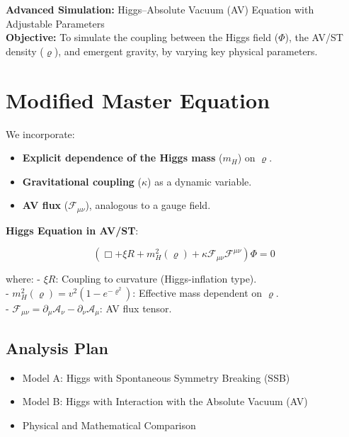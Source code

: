 \documentclass[twoside]{article}
\theoremstyle{definition}
\theoremstyle{remark}
\numberwithin{equation}{section}
\theoremstyle{definition}
\theoremstyle{example}
\theoremstyle{remark}
\numberwithin{equation}{section}%
\begin{document}
	\textbf{Advanced Simulation:} Higgs–Absolute Vacuum (AV) Equation with Adjustable Parameters\\
	\textbf{Objective:} To simulate the coupling between the Higgs field (\(\Phi\)), the AV/ST density (\(\varrho\)), and emergent gravity, by varying key physical parameters.\\
	
	\section{Modified Master Equation}
	
	We incorporate: 
	
	\begin{itemize}
	\item \textbf{Explicit dependence of the Higgs mass} (\(m_H\)) on \(\varrho\).
	\item \textbf{Gravitational coupling} (\(\kappa\)) as a dynamic variable.
	\item \textbf{AV flux} (\(\mathcal{F}_{\mu\nu}\)), analogous to a gauge field.
	\end{itemize}
	
	\textbf{Higgs Equation in AV/ST}: 
	
	\begin{equation}\label{e1}
		\left( \Box + \xi R + m_H^2(\varrho) + \kappa \mathcal{F}_{\mu\nu} \mathcal{F}^{\mu\nu} \right) \Phi = 0
	\end{equation}
	
	where:  
	- \(\xi R\): Coupling to curvature (Higgs-inflation type).\\
	- \(m_H^2(\varrho) = v^2 (1 - e^{-\varrho^2})\): Effective mass dependent on \(\varrho\).\\
	- \(\mathcal{F}_{\mu\nu} = \partial_\mu \mathcal{A}_\nu - \partial_\nu \mathcal{A}_\mu\): AV flux tensor.\\
	
	\subsection{Analysis Plan}
	
	\begin{itemize}
		\item Model A: Higgs with Spontaneous Symmetry Breaking (SSB)
		\item Model B: Higgs with Interaction with the Absolute Vacuum (AV)
		\item Physical and Mathematical Comparison
	\end{itemize}
	
\end{document}
